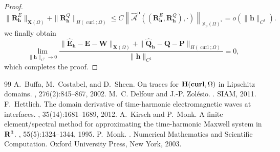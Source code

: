 \documentclass[10pt,a4paper]{amsart}
\numberwithin{equation}{section}
\begin{document}
\begin{proof}
\[
\|\mathbf{R}_{\mathbf{h}}^E\|_{\mathbf{X}(\Omega)} + \|\mathbf{R}_{\mathbf{h}}^Q\|_{H(\operatorname{curl}; \Omega)} \le C \left\| \widehat{\mathcal{A}}^{\mathrm{p}}((\mathbf{R}_{\mathbf{h}}^E, \mathbf{R}_{\mathbf{h}}^Q), \cdot) \right\|_{\mathbb{X}_{\mathrm{p}}(\Omega)^*} = o(\|\mathbf{h}\|_{C^1}).
\]
we finally obtain
\[
\lim_{\|\mathbf{h}\|_{C^1} \to 0} \frac{\|\hat{\mathbf{E}}_{\mathbf{h}} - \mathbf{E} - \mathbf{W}\|_{\mathbf{X}(\Omega)} + \|\hat{\mathbf{Q}}_{\mathbf{h}} - \mathbf{Q} - \mathbf{P}\|_{H(\operatorname{curl};\Omega)}}{\|\mathbf{h}\|_{C^1}} = 0,
\]
which completes the proof.
\end{proof}


\begin{thebibliography}{99}
 A.~Buffa, M.~Costabel, and D.~Sheen. \newblock On traces for {${\bf H}({\bf curl},\Omega)$} in {L}ipschitz domains. , 276(2):845--867, 2002.
 M.~C. Delfour and J.-P. Zol{\'e}sio. . \newblock SIAM, 2011.
 F.~Hettlich. \newblock The domain derivative of time-harmonic electromagnetic waves at interfaces. , 35(14):1681--1689, 2012.
 A.~Kirsch and P.~Monk. \newblock A finite element/spectral method for approximating the time-harmonic {M}axwell system in {${\bf R}^3$}. , 55(5):1324--1344, 1995.
 P.~Monk. . \newblock Numerical Mathematics and Scientific Computation. Oxford University Press, New York, 2003.
\end{thebibliography}
\end{document}
